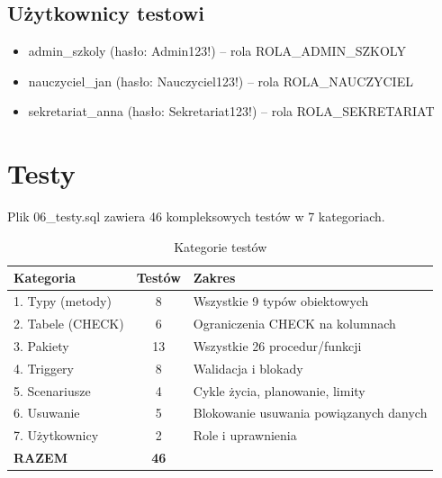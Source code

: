 \documentclass[12pt,a4paper]{article}
\begin{document}
\subsection{Użytkownicy testowi}
\begin{itemize}[nosep]
    \item admin\_szkoly (hasło: Admin123!) -- rola ROLA\_ADMIN\_SZKOLY
    \item nauczyciel\_jan (hasło: Nauczyciel123!) -- rola ROLA\_NAUCZYCIEL
    \item sekretariat\_anna (hasło: Sekretariat123!) -- rola ROLA\_SEKRETARIAT
\end{itemize}

\section{Testy}

Plik 06\_testy.sql zawiera 46 kompleksowych testów w 7 kategoriach.

\begin{table}[h]
\centering
\begin{tabular}{|l|c|p{6cm}|}
\hline
\textbf{Kategoria} & \textbf{Testów} & \textbf{Zakres} \\
\hline
1. Typy (metody) & 8 & Wszystkie 9 typów obiektowych \\
2. Tabele (CHECK) & 6 & Ograniczenia CHECK na kolumnach \\
3. Pakiety & 13 & Wszystkie 26 procedur/funkcji \\
4. Triggery & 8 & Walidacja i blokady \\
5. Scenariusze & 4 & Cykle życia, planowanie, limity \\
6. Usuwanie & 5 & Blokowanie usuwania powiązanych danych \\
7. Użytkownicy & 2 & Role i uprawnienia \\
\hline
\textbf{RAZEM} & \textbf{46} & \\
\hline
\end{tabular}
\caption{Kategorie testów}
\end{table}
\end{document}
